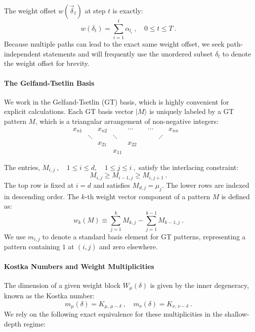 \documentclass[11pt,letterpaper]{article}
\newcommand{\ket}[1]{| #1 \rangle}
\begin{document}
The weight offset $w(\vec\delta_t)$ at step $t$ is exactly:
\begin{equation}
    w(\delta_t) = \sum_{i=1}^t\alpha_{l_i} \ , \quad 0 \leq t \leq T \ .
\end{equation}
Because multiple paths can lead to the exact same weight offset, we seek path-independent statements and will frequently use the unordered subset $\delta_t$ to denote the weight offset for brevity.

\paragraph{The Gelfand-Tsetlin Basis}
We work in the Gelfand-Tsetlin (GT) basis, which is highly convenient for explicit calculations. Each GT basis vector $\ket{M}$ is uniquely labeled by a GT pattern $M$, which is a triangular arrangement of non-negative integers:
\[
\begin{matrix}
x_{n1} && x_{n2} && \cdots && \cdots && x_{nn}\\
& \ddots && \ddots && && \iddots && \\
&& x_{21} && x_{22}\\
&&& x_{11}
\end{matrix}
\]

The entries, $M_{i,j}\ , \quad 1\leq i\leq d,\quad 1\leq j\leq i \ ,$ satisfy the interlacing constraint:
\begin{equation}
    M_{i,j} \ge M_{i-1,j} \ge M_{i,j+1} \ .
\end{equation}
The top row is fixed at $i=d$ and satisfies $M_{d,j} = \mu_j$. The lower rows are indexed in descending order. The $k$-th weight vector component of a pattern $M$ is defined as:
\begin{equation}
    w_k(M) \equiv \sum_{j=1}^k M_{k,j} - \sum_{j=1}^{k-1} M_{k-1,j} \ .
\end{equation}
We use $m_{i,j}$ to denote a standard basis element for GT patterns, representing a pattern containing $1$ at $(i,j)$ and zero elsewhere. 

\paragraph{Kostka Numbers and Weight Multiplicities}
The dimension of a given weight block $W_\mu(\delta)$ is given by the inner degeneracy, known as the Kostka number:
\begin{equation}
    m_\mu(\delta) = K_{\mu,\,\mu-\delta} \ , \quad m_\nu(\delta) = K_{\nu,\,\nu-\delta} \ .
\end{equation}
We rely on the following exact equivalence for these multiplicities in the shallow-depth regime:
\end{document}
